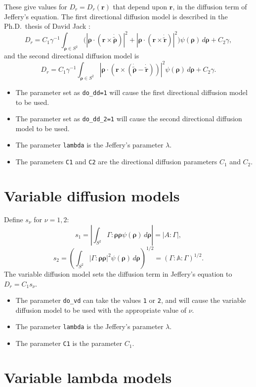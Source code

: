 \documentclass{amsart}
\newcommand{\br}{{\mathbf r}}
\newcommand{\brho}{{\boldsymbol \rho}}
\begin{document}
\noindent
These give values for $D_r=D_r(\br)$ that depend upon $\br$, in the diffusion term of Jeffery's equation.  The first directional diffusion model is described in the Ph.D.\ thesis of David Jack \cite{jack}:
$$ D_r = C_1 \gamma^{-1} \int_{\brho \in S^2} \bigl(|\brho\cdot(\br\times\dot{\tilde\brho})|^2 + |\brho\cdot(\br\times\dot{\tilde\br})|^2\bigr) \psi(\brho) \, d\brho +
C_2 \gamma ,$$
and the second directional diffusion model is
$$ D_r = C_1 \gamma^{-1} \int_{\brho \in S^2} |\brho\cdot(\br\times(\dot{\tilde\brho}-\dot{\tilde \br}))|^2 \psi(\brho) \, d\brho +
C_2 \gamma .$$
\begin{itemize}
\item The parameter set as {\tt do\_dd=1} will cause the first directional diffusion model to be used.
\item The parameter set as {\tt do\_dd\_2=1} will cause the second directional diffusion model to be used.
\item The parameter {\tt lambda} is the Jeffery's parameter $\lambda$.
\item The parameters {\tt C1} and {\tt C2} are the directional diffusion parameters $C_1$ and $C_2$.
\end{itemize}

\section*{Variable diffusion models}

\noindent
Define $s_\nu$ for $\nu=1,2$:
$$ s_1 = \left|\int_{S^2} \Gamma:\brho\brho \psi(\brho) \, d\brho\right|
   = |A :\Gamma| ,$$
$$ s_2 = \left(\int_{S^2} \left|\Gamma:\brho\brho\right|^2 \psi(\brho) \, d\brho\right)^{1/2} = \left(\Gamma: \mathbb A:\Gamma\right)^{1/2} . $$
The variable diffusion model sets the diffusion term in Jeffery's equation to $D_r = C_1 s_\nu$.
\begin{itemize}
\item The parameter {\tt do\_vd} can take the values {\tt 1} or {\tt 2}, and will cause the variable diffusion model to be used with the appropriate value of $\nu$.
\item The parameter {\tt lambda} is the Jeffery's parameter $\lambda$.
\item The parameter {\tt C1} is the parameter $C_1$.
\end{itemize}

\section*{Variable lambda models}
\end{document}
